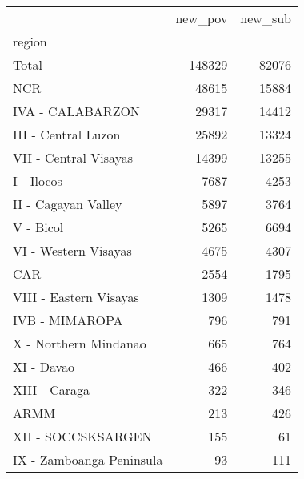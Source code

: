 \begin{tabular}{lrr}
\toprule
{} &  new\_pov &  new\_sub \\
region                   &          &          \\
\midrule
Total                    &   148329 &    82076 \\
NCR                      &    48615 &    15884 \\
IVA - CALABARZON         &    29317 &    14412 \\
III - Central Luzon      &    25892 &    13324 \\
VII - Central Visayas    &    14399 &    13255 \\
I - Ilocos               &     7687 &     4253 \\
II - Cagayan Valley      &     5897 &     3764 \\
V - Bicol                &     5265 &     6694 \\
VI - Western Visayas     &     4675 &     4307 \\
CAR                      &     2554 &     1795 \\
VIII - Eastern Visayas   &     1309 &     1478 \\
IVB - MIMAROPA           &      796 &      791 \\
X - Northern Mindanao    &      665 &      764 \\
XI - Davao               &      466 &      402 \\
XIII - Caraga            &      322 &      346 \\
ARMM                     &      213 &      426 \\
XII - SOCCSKSARGEN       &      155 &       61 \\
IX - Zamboanga Peninsula &       93 &      111 \\
\bottomrule
\end{tabular}
